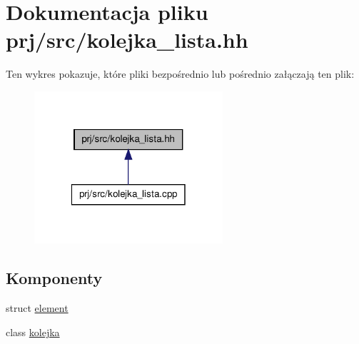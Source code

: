 \hypertarget{kolejka__lista_8hh}{\section{\-Dokumentacja pliku prj/src/kolejka\-\_\-lista.hh}
\label{kolejka__lista_8hh}
}
\-Ten wykres pokazuje, które pliki bezpośrednio lub pośrednio załączają ten plik\-:\nopagebreak
\begin{figure}[H]
\begin{center}
\leavevmode
\includegraphics[width=198pt]{kolejka__lista_8hh__dep__incl}
\end{center}
\end{figure}
\subsection*{\-Komponenty}
\begin{DoxyCompactItemize}
\item 
struct \hyperlink{structelement}{element}
\item 
class \hyperlink{classkolejka}{kolejka}
\end{DoxyCompactItemize}
